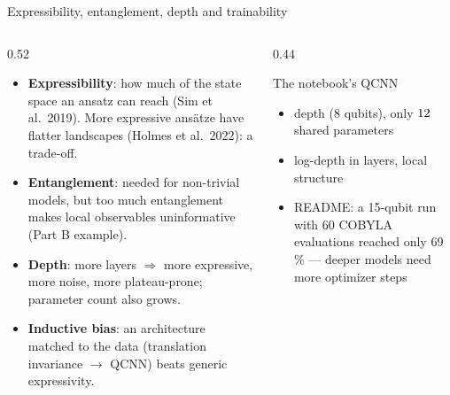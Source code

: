 \documentclass[aspectratio=169,11pt]{beamer}
\newcommand{\key}[1]{{\color{qdark}\textbf{#1}}}
\begin{document}
\begin{frame}[label=fExpr]{Expressibility, entanglement, depth and trainability}
  \begin{columns}[T]
    \begin{column}{0.52\textwidth}
      \small
      \begin{itemize}\itemsep2pt
        \item \key{Expressibility}: how much of the state space an ansatz can reach (Sim et al.\ 2019). More expressive ans\"atze have flatter landscapes
          (Holmes et al.\ 2022): a trade-off.
        \item \key{Entanglement}: needed for non-trivial models, but too much entanglement makes local observables uninformative (Part B example).
        \item \key{Depth}: more layers $\Rightarrow$ more expressive, more noise, more plateau-prone; parameter count also grows.
        \item \key{Inductive bias}: an architecture matched to the data (translation invariance $\to$ QCNN) beats generic expressivity.
      \end{itemize}
    \end{column}
    \begin{column}{0.44\textwidth}
      \begin{block}{The notebook's QCNN}
        \scriptsize
        \begin{itemize}\itemsep1pt
          \item depth \numdepth{} (8 qubits), only $12$ shared parameters
          \item log-depth in layers, local structure
          \item README: a 15-qubit run with 60 COBYLA evaluations reached only 69\,\% --- deeper models need more optimizer steps
        \end{itemize}
      \end{block}
    \end{column}
  \end{columns}
\end{frame}
\end{document}
